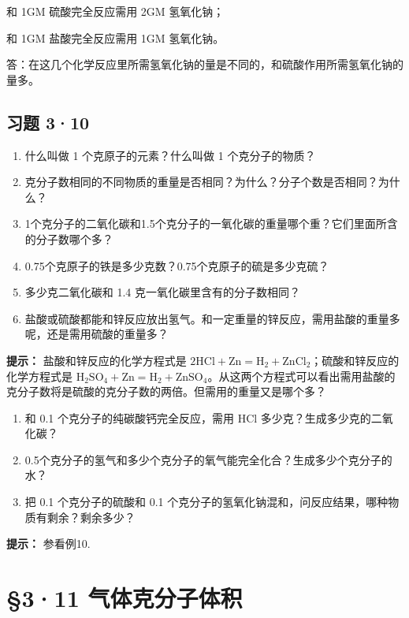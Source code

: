 和 1GM 硫酸完全反应需用 2GM 氢氧化钠；

和 1GM 盐酸完全反应需用 1GM 氢氧化钠。

答：在这几个化学反应里所需氢氧化钠的量是不同的，和硫酸作用所需氢氧化钠的量多。

\subsection{习题 3·10}

\begin{enumerate}
\item
  什么叫做 1 个克原子的元素？什么叫做 1 个克分子的物质？
\item
  克分子数相同的不同物质的重量是否相同？为什么？分子个数是否相同？为什么？
\item
  1个克分子的二氧化碳和1.5个克分子的一氧化碳的重量哪个重？它们里面所含的分子数哪个多？
\item
  0.75个克原子的铁是多少克数？0.75个克原子的硫是多少克硫？
\item
  多少克二氧化碳和 1.4 克一氧化碳里含有的分子数相同？
\item
  盐酸或硫酸都能和锌反应放出氢气。和一定重量的锌反应，需用盐酸的重量多呢，还是需用硫酸的重量多？
\end{enumerate}

\begin{shulihuadef}
\textbf{提示：} 盐酸和锌反应的化学方程式是
\(2\mathrm{HCl} + \mathrm{Zn} = \mathrm{H}_{2} + \mathrm{ZnCl}_{2}\)；硫酸和锌反应的化学方程式是
\(\mathrm{H}_{2}\mathrm{SO}_{4} + \mathrm{Zn} = \mathrm{H}_{2} + \mathrm{ZnSO}_{4}\)。从这两个方程式可以看出需用盐酸的克分子数将是硫酸的克分子数的两倍。但需用的重量又是哪个多？
\end{shulihuadef}

\begin{enumerate}[start=7]
\item
  和 0.1 个克分子的纯碳酸钙完全反应，需用 HCl
  多少克？生成多少克的二氧化碳？
\item
  0.5个克分子的氢气和多少个克分子的氧气能完全化合？生成多少个克分子的水？
\item
  把 0.1 个克分子的硫酸和 0.1
  个克分子的氢氧化钠混和，问反应结果，哪种物质有剩余？剩余多少？
\end{enumerate}

\begin{shulihuadef}
\textbf{提示：} 参看例10.
\end{shulihuadef}

\section{§3·11 气体克分子体积}

